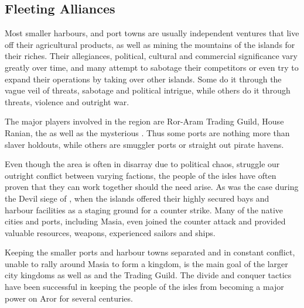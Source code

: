 \subsection{Fleeting Alliances}

Most smaller harbours, and port towns are usually independent ventures that
live off their agricultural products, as well as mining the mountains of
the islands for their riches. Their allegiances, political, cultural and
commercial significance vary greatly over time, and many attempt to sabotage
their competitors or even try to expand their operations by taking over other
islands. Some do it through the vague veil of threats, sabotage and political
intrigue, while others do it through threats, violence and outright war.

The major players involved in the region are Ror-Aram Trading Guild, House
Ranian, the  as well as the mysterious
. Thus some ports are nothing more than slaver
holdouts, while others are smuggler ports or straight out pirate havens.

Even though the area is often in disarray due to political chaos, struggle our
outright conflict between varying factions, the people of the isles have often
proven that they can work together should the need arise. As was the case during
the Devil siege of , when the islands offered their highly
secured bays and harbour facilities as a staging ground for a counter strike.
Many of the native cities and ports, including Masia, even joined the counter
attack and provided valuable resources, weapons, experienced sailors and ships.

Keeping the smaller ports and harbour towns separated and in constant conflict,
unable to rally around Masia to form a kingdom, is the main goal of the larger
city kingdoms as well as  and the Trading Guild. The
divide and conquer tactics have been successful in keeping the people of the
isles from becoming a major power on Aror for several centuries.
